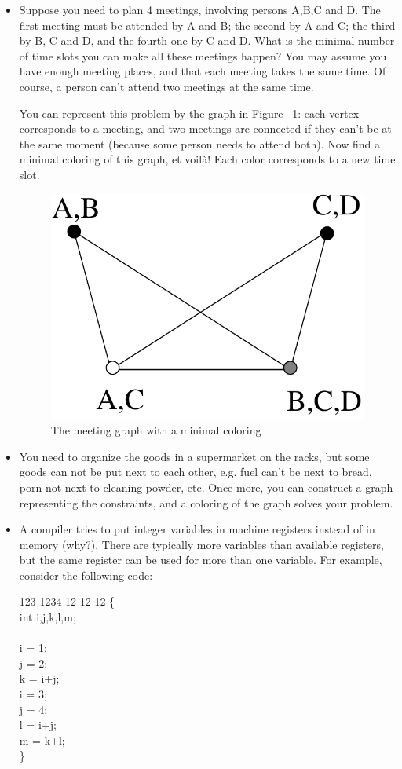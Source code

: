 \begin{itemize}
\item
Suppose you need to plan 4 meetings, involving persons A,B,C and D. The
first meeting must be attended by A and B; the second by A and C; the
third by B, C and D, and the fourth one by C and D. What is the
minimal number of time slots you can make all these meetings happen?
You may assume you have enough meeting places, and that each meeting
takes the same time. Of course, a person can't attend two meetings at
the same time.

You can represent this problem by the graph in Figure~
\ref{planning1}: each vertex corresponds to a meeting, and two
meetings are connected if they can't be at the same moment (because
some person needs to attend both). Now find a minimal coloring of this
graph, et voil\`{a}! Each color corresponds to a new time slot.
\begin{figure}[ht]
\begin{center}
\includegraphics[width=0.2\linewidth,keepaspectratio]{planning1}
\end{center}
\caption{The meeting graph with a minimal coloring\label{planning1}}
\end{figure}

\item
You need to organize the goods in a supermarket on the racks, but some
goods can not be put next to each other, e.g. fuel can't be next to
bread, porn not next to cleaning powder, etc. Once more, you can
construct a graph representing the constraints, and a coloring of the
graph solves your problem.

\item
A compiler tries to put integer variables in machine registers
instead of in memory (why?). There are typically more variables than
available registers, but the same register can be used for more than
one variable. For example, consider the following code:


\parbox{9cm}{
\begin{tabbing}
123 \= 1234 \= 12 \= 12 \= 12 \kill
\> \> \{\\
\> \> \> int i,j,k,l,m;\\
\\
\> \> \> i = 1;\\
\> \> \> j = 2;\\
\> \> \> k = i+j;\\
\> \> \> i = 3;\\
\> \> \> j = 4;\\
\> \> \> l = i+j;\\
\> \> \> m = k+l;\\
\> \> \}
\end{tabbing}
}\\


\end{itemize}
